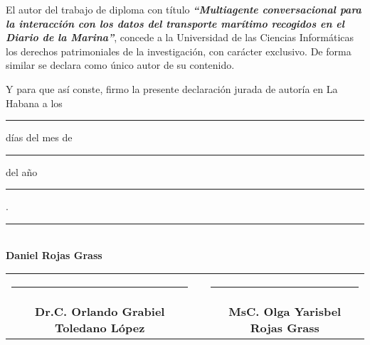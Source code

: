 \authorshipdeclared

\parskip 10pt 
\setlength{\parindent}{0pc}

El autor del trabajo de diploma con título  \textit{\textbf{“Multiagente conversacional para la interacción con los datos del transporte marítimo recogidos en el Diario de la Marina”}}, concede a la Universidad de las Ciencias Informáticas los derechos patrimoniales de la investigación, con carácter exclusivo. De forma similar se declara como único autor de su contenido.

Y para que así conste, firmo la presente declaración jurada de autoría en La Habana a los \rule{8mm}{0.2mm} días del mes de \rule{30mm}{0.2mm} del año \rule{15mm}{0.2mm}.


\vspace{1in}

\begin{center}
	\rule{60mm}{0.3mm} \\
	\textbf{Daniel Rojas Grass}
\end{center}

\vspace{0.5in}

\begin{center}
	\begin{tabular}{cp{0.5in}c}		
		\rule{65mm}{0.3mm}      &   & \rule{65mm}{0.3mm}        \\
		\textbf{Dr.C. Orlando Grabiel Toledano López}      &   & \textbf{MsC. Olga Yarisbel Rojas Grass}
	\end{tabular}
\end{center}

\vspace{0.5in}
